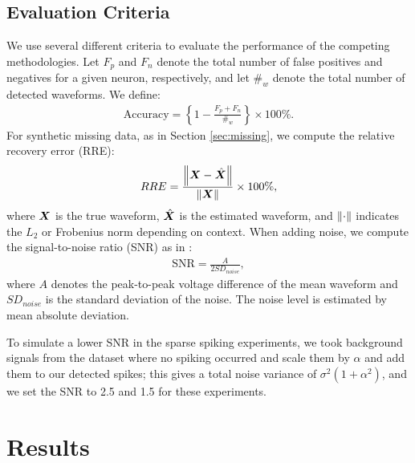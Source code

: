 \documentclass[journal]{IEEEtran}
\begin{document}


\subsection{Evaluation Criteria} \label{sec:eval}


We use several different criteria to evaluate the performance of the competing methodologies. 
{Let  $F_p$ and $F_n$ denote the total number of false positives and negatives for a given neuron, respectively, and let $\#_w$ denote the total number of detected waveforms.}
{We define:}
\begin{align}
	\mbox{Accuracy} = \left\{1-\frac{F_p+F_n}{\#_w}\right\} \times 100\%.
\end{align}
% 
For synthetic missing data, as in Section \ref{sec:missing}, we compute the relative recovery error (RRE):
\begin{align}
	\relax{RRE} = \frac{\left \lVert\boldsymbol{X}-\hat{\boldsymbol{X}} \right \rVert}{\left \lVert\boldsymbol{X} \right \rVert} \times 100\%, 
\end{align}
where $\boldsymbol{X}$ is the true waveform, $\hat{\boldsymbol{X}}$ is the estimated waveform, and $\left \lVert\cdot \right \rVert$ indicates the $L_2$ or Frobenius norm depending on context. 
% 
When adding noise, we compute the signal-to-noise ratio (SNR) as in \cite{Suner2005}:
\begin{align}
	\text{SNR} = \frac{A}{2 SD_{noise}},	
\end{align}
where $A$ denotes the peak-to-peak voltage difference of the mean waveform and $SD_{noise}$ is the standard deviation of the noise.  The noise level is estimated by mean absolute deviation.

To simulate a lower SNR in the sparse spiking experiments, we took background signals from the  dataset where no spiking occurred and scale them by $\alpha$ and add them to our detected spikes; this gives a total noise variance of $\sigma^2 (1+\alpha^2)$, and we set the SNR to 2.5 and 1.5 for these experiments.









\section{Results\label{sec:results}}
\end{document}

